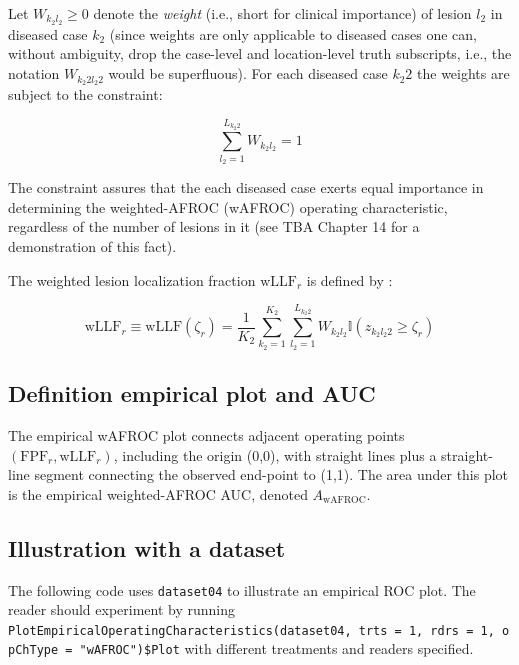 \documentclass[
]{book}
\begin{document}
Let \(W_{k_2 l_2} \geq 0\) denote the \emph{weight} (i.e., short for clinical importance) of lesion \(l_2\) in diseased case \(k_2\) (since weights are only applicable to diseased cases one can, without ambiguity, drop the case-level and location-level truth subscripts, i.e., the notation \(W_{k_2 2 l_2 2}\) would be superfluous). For each diseased case \(k_2 2\) the weights are subject to the constraint:

\begin{equation}
\sum_{l_2 =1 }^{L_{k_2 2}} W_{k_2 l_2} = 1
\label{eq:froc-empirical-weights-constraint}
\end{equation}

The constraint assures that the each diseased case exerts equal importance in determining the weighted-AFROC (wAFROC) operating characteristic, regardless of the number of lesions in it (see TBA Chapter 14 for a demonstration of this fact).

The weighted lesion localization fraction \(\text{wLLF}_r\) is defined by \citep{RN2484}:

\begin{equation}
\text{wLLF}_r \equiv \text{wLLF}\left ( \zeta_r \right ) = \frac{1}{K_2}\sum_{k_2=1}^{K_2}\sum_{l_2=1}^{L_{k_2 2}}W_{k_2 l_2} \mathbb{I}\left ( z_{k_2 l_2 2} \geq \zeta_r \right )
\label{eq:froc-empirical-wLLFr}
\end{equation}

\hypertarget{froc-empirical-definition-empirical-auc-wafroc}{%
\subsection{Definition empirical plot and AUC}\label{froc-empirical-definition-empirical-auc-wafroc}}

The empirical wAFROC plot connects adjacent operating points \(\left ( \text{FPF}_r, \text{wLLF}_r \right )\), including the origin (0,0), with straight lines plus a straight-line segment connecting the observed end-point to (1,1). The area under this plot is the empirical weighted-AFROC AUC, denoted \(A_{\text{wAFROC}}\).

\hypertarget{froc-empirical-wafroc-plot-illustration}{%
\subsection{Illustration with a dataset}\label{froc-empirical-wafroc-plot-illustration}}

The following code uses \texttt{dataset04} to illustrate an empirical ROC plot. The reader should experiment by running \texttt{PlotEmpiricalOperatingCharacteristics(dataset04,\ trts\ =\ 1,\ rdrs\ =\ 1,\ opChType\ =\ "wAFROC")\$Plot} with different treatments and readers specified.
\end{document}
